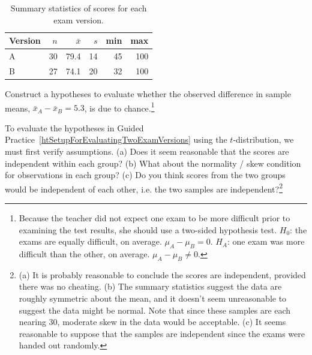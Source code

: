 {\begin{table}[hht]
\centering
\begin{tabular}{l rrrrr}
\hline
Version\hspace{2mm}	& $n$	& $\bar{x}$	& $s$	& min	& max  \\
\hline
A		& 30		& 79.4		& 14 	& 45		& 100 \\
B		& 27		& 74.1		& 20		& 32		& 100 \\
\hline
\end{tabular}
\caption{Summary statistics of scores for each exam version.}
\label{summaryStatsForTwoVersionsOfExams}
\end{table}

\begin{exercise} \label{htSetupForEvaluatingTwoExamVersions}
Construct a hypotheses to evaluate whether the observed difference in sample means, $\bar{x}_A - \bar{x}_B=5.3$, is due to chance.\footnote{Because the teacher did not expect one exam to be more difficult prior to examining the test results, she should use a two-sided hypothesis test. $H_0$: the exams are equally difficult, on average. $\mu_A - \mu_B = 0$. $H_A$: one exam was more difficult than the other, on average. $\mu_A - \mu_B \neq 0$.}
\end{exercise}

\begin{exercise} \label{conditionsForTDistForEvaluatingTwoExamVersions}
To evaluate the hypotheses in Guided Practice~\ref{htSetupForEvaluatingTwoExamVersions} using the $t$-distribution, we must first verify assumptions. (a) Does it seem reasonable that the scores are independent within each group? (b) What about the normality / skew condition for observations in each group? (c) Do you think scores from the two groups would be independent of each other, i.e. the two samples are independent?\footnote{(a) It is probably reasonable to conclude the scores are independent, provided there was no cheating. (b) The summary statistics suggest the data are roughly symmetric about the mean, and it doesn't seem unreasonable to suggest the data might be normal. Note that since these samples are each nearing 30, moderate skew in the data would be acceptable. (c) It seems reasonable to suppose that the samples are independent since the exams were handed out randomly.}
\end{exercise}

}

